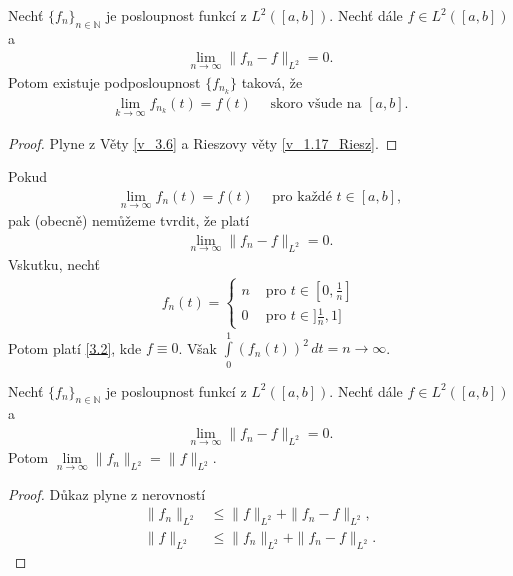 \begin{dusledek}
\label{3.7.dusledek}
Nechť $\{f_n\}_{n \in \mathbb{N}}$ je posloupnost funkcí z $ L^2 ([a,b])$. Nechť dále $f \in L^2 ([a,b])$ a 
\begin{align*}
\lim_{n \rightarrow \infty} \| f_n - f \|_{L^2} = 0.
\end{align*}
Potom existuje podposloupnost $\{f_{n_k}\}$ taková, že
\begin{align*}
\lim_{k \rightarrow \infty} f_{n_k}(t) = f(t) \quad \textrm{ skoro všude na } [a,b].
\end{align*}
\end{dusledek}
\begin{proof}
Plyne z Věty \ref{v_3.6} a Rieszovy věty \ref{v_1.17_Riesz}.
\end{proof}


\begin{poznamka}\label{3.8.poznamka}

Pokud
\begin{align}\label{3.2}
\lim_{n \rightarrow \infty} f_n(t) = f(t) \quad \textrm{ pro každé } t \in [a,b], 
\end{align}
pak (obecně) nemůžeme tvrdit, že platí 
\begin{align*}
\lim_{n \rightarrow \infty} \| f_n - f \|_{L^2} = 0.
\end{align*}
Vskutku, nechť
\begin{align*}
f_n(t)=
\left\{
\begin{array}{cl}
n & \textrm{ pro } t \in [0, \frac{1}{n}]\\
0 & \text{ pro } t \in ]\frac{1}{n},1]
\end{array}
\right.
\end{align*}
Potom platí \ref{3.2}, kde $f \equiv 0$. Však $\int \limits_0^1 (f_n(t))^2 \,  dt = n \rightarrow \infty$.
\end{poznamka}

\begin{theorem}\label{3.9}
Nechť $\{f_n\}_{n \in \mathbb{N}}$ je posloupnost funkcí z $ L^2 ([a,b])$. Nechť dále $f \in L^2 ([a,b])$ a 
\begin{align*}
\lim \limits _{n \rightarrow \infty} \| f_n - f \|_{L^2} = 0.
\end{align*}
Potom $\lim \limits _{n \rightarrow \infty} \|f_n\|_{L^2} = \|f\|_{L^2}$.
\end{theorem}
\begin{proof}
Důkaz plyne z nerovností
\begin{align*}
\|f_n\|_{L^2} &\leq \|f\|_{L^2} + \|f_n - f\|_{L^2},\\
 \|f\|_{L^2} &\leq \|f_n\|_{L^2} + \|f_n - f \|_{L^2}.
\end{align*}
\end{proof}


